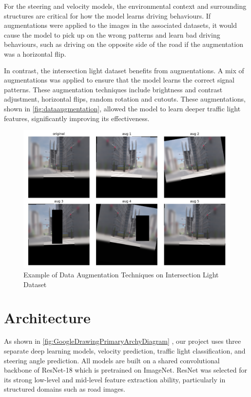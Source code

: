 \documentclass{article} %
\begin{document}
For the steering and velocity models, the environmental context and surrounding structures are critical for how the model learns driving behaviours. If augmentations were applied to the images in the associated datasets, it would cause the model to pick up on the wrong patterns and learn bad driving behaviours, such as driving on the opposite side of the road if the augmentation was a horizontal flip. 

In contrast, the intersection light dataset benefits from augmentations.  A mix of augmentations was applied to ensure that the model learns the correct signal patterns. These augmentation techniques include brightness and contrast adjustment, horizontal flips, random rotation and cutouts. These augmentations, shown in \autoref{fig:dataaugmentation}, allowed the model to learn deeper traffic light features,  significantly improving its effectiveness. 

\begin{figure}[H] %
    \centering
    \includegraphics[width=1.0\textwidth]{Data Augmentation.png} %
    \caption{Example of Data Augmentation Techniques on Intersection Light Dataset}
    \label{fig:dataaugmentation}
\end{figure}

\section{Architecture}

As shown in \autoref{fig:GoogleDrawingPrimaryArchyDiagram} , our project uses three separate deep learning models, velocity prediction, traffic light classification, and steering angle prediction. 
All models are built on a shared convolutional backbone of ResNet-18 which is pretrained on ImageNet. ResNet was selected for its strong low-level and mid-level feature extraction ability, particularly in structured domains such as road images. 
\end{document}
